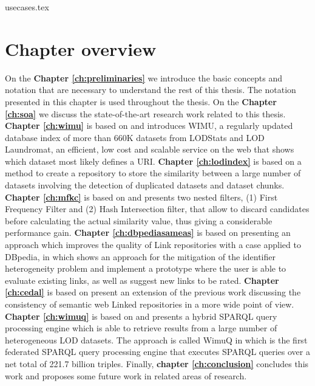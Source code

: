{usecases.tex}

\section{Chapter overview}
On the \textbf{Chapter \ref{ch:preliminaries}} we introduce the basic concepts and notation that are necessary to understand the rest of this thesis. The notation presented in this chapter is used throughout the thesis. On the \textbf{Chapter \ref{ch:soa}} we discuss the state-of-the-art research work related to this thesis. \textbf{Chapter \ref{ch:wimu}} is based on \cite{valdestilhas2018my} and introduces WIMU, a regularly updated database index of more than 660K datasets from LODStats and LOD Laundromat, an efficient, low cost and scalable service on the web that shows which dataset most likely defines a URI. \textbf{Chapter \ref{ch:lodindex}} is based on \cite{valdestilhas2019ReLOD} a method to create a repository to store the similarity between a large number of datasets involving the detection of duplicated datasets and dataset chunks. \textbf{Chapter \ref{ch:mfkc}} is based on \cite{valdestilhas2017high} and presents two nested filters, (1) First Frequency Filter and (2) Hash Intersection filter, that allow to discard candidates before calculating the actual similarity value, thus giving a considerable performance gain. \textbf{Chapter \ref{ch:dbpediasameas}} is based on \cite{valdestilhasdbpediasameas} presenting an approach which improves the quality of Link repositories with a case applied to DBpedia, in which shows an approach for the mitigation of the identifier heterogeneity problem and implement a prototype where the user is able to evaluate existing links, as well as suggest new links to be rated. \textbf{Chapter \ref{ch:cedal}} is based on \cite{valdestilhas2017cedal} present an extension of the previous work \cite{valdestilhasdbpediasameas} discussing the consistency of semantic web Linked repositories in a more wide point of view. \textbf{Chapter \ref{ch:wimuq}} is based on \cite{ValdestilhasKcap} and presents a hybrid SPARQL query processing engine which is able to retrieve results from a large number of heterogeneous LOD datasets. The approach is called WimuQ in which is the first federated SPARQL query processing engine that executes SPARQL queries over a net total of 221.7 billion triples. Finally, \textbf{chapter \ref{ch:conclusion}} concludes this work and proposes some future work in related areas of research.


